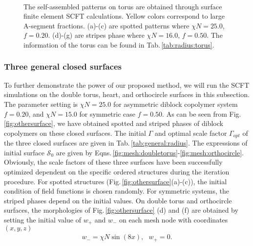 \documentclass[final,1p,times]{elsarticle}
\newcommand{\calS}{\mathcal{S}}
\begin{document}
\begin{figure}[H]
\setlength{\captionmargin}{2pt}
\centering
{}
    \hspace{0.5cm}
    \hspace{0.5cm}
\\
    \hspace{0.5cm}
    \hspace{0.5cm}
    \hspace{0.5cm}
\caption{The self-assembled patterns on torus are
obtained through surface finite element SCFT calculations.
Yellow colors correspond to large A-segment fractions.
(a)-(c) are spotted patterns where $\chi N= 25.0$, $f=0.20$.
(d)-(g) are stripes phase where $\chi N=16.0$, $f=0.50$.
The information of the torus can be 
found in Tab.\,\ref{tab:radius:torus}.  }
\label{fig:torus}
\end{figure}


\subsubsection{Three general closed surfaces}
\label{subsubsec:generalsurface}

To further demonstrate the power of our proposed method, we will run 
the SCFT simulations on the double torus, heart, and orthocircle surfaces in
this subsection. The parameter setting is $\chi N=25.0$ for asymmetric diblock
copolymer system $f=0.20$, and $\chi N = 15.0$ for symmetric case $f=0.50$. As
can be seen from Fig.\,\ref{fig:othersurface}, we have obtained spotted and
striped phases of diblock copolymers on these  closed surfaces. The initial
$\Gamma$ and optimal scale factor $\Gamma_{opt}$ of the three closed surfaces
are given in Tab.\,\ref{tab:general:radius}.  The expressions of initial
surface $\calS_0$ are given by
Eqns.\,\eqref{fig:mesh:doubletorus}-\eqref{fig:mesh:orthocircle}.  Obviously,
the scale factors of these three surfaces have been successfully optimized
dependent on the specific ordered structures during the iteration procedure.
For spotted structures (Fig.\,\ref{fig:othersurface}(a)-(c)), the initial
condition of field functions is chosen randomly.  For symmetric systems, the
striped phases depend on the initial values. On double torus and orthocircle
surfaces, the morphologies of Fig.\,\ref{fig:othersurface} (d) and (f) are
obtained by setting the initial value of $w_+$ and $w_-$ on each mesh node with
coordinates $(x, y, z)$
\begin{align*}
    w_{-} = \chi N\sin(8x), ~~~ w_{+}  = 0.
\end{align*} 
\end{document}
